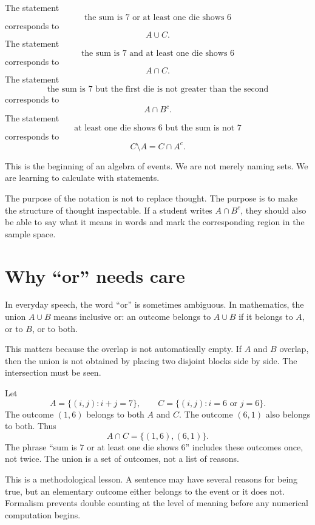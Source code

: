 The statement
\[
\text{the sum is }7\text{ or at least one die shows }6
\]
corresponds to
\[
A\cup C.
\]
The statement
\[
\text{the sum is }7\text{ and at least one die shows }6
\]
corresponds to
\[
A\cap C.
\]
The statement
\[
\text{the sum is }7\text{ but the first die is not greater than the second}
\]
corresponds to
\[
A\cap B^c.
\]
The statement
\[
\text{at least one die shows }6\text{ but the sum is not }7
\]
corresponds to
\[
C\setminus A=C\cap A^c.
\]

This is the beginning of an algebra of events. We are not merely naming sets. We are learning to calculate with statements.

\begin{remarkbox}
The purpose of the notation is not to replace thought. The purpose is to make the structure of thought inspectable. If a student writes \(A\cap B^c\), they should also be able to say what it means in words and mark the corresponding region in the sample space.
\end{remarkbox}

\section{Why ``or'' needs care}

In everyday speech, the word ``or'' is sometimes ambiguous. In mathematics, the union \(A\cup B\) means inclusive or: an outcome belongs to \(A\cup B\) if it belongs to \(A\), or to \(B\), or to both.

This matters because the overlap is not automatically empty. If \(A\) and \(B\) overlap, then the union is not obtained by placing two disjoint blocks side by side. The intersection must be seen.

\begin{examplebox}
Let
\[
A=\{(i,j):i+j=7\},\qquad C=\{(i,j):i=6\text{ or }j=6\}.
\]
The outcome \((1,6)\) belongs to both \(A\) and \(C\). The outcome \((6,1)\) also belongs to both. Thus
\[
A\cap C=\{(1,6),(6,1)\}.
\]
The phrase ``sum is \(7\) or at least one die shows \(6\)'' includes these outcomes once, not twice. The union is a set of outcomes, not a list of reasons.
\end{examplebox}

This is a methodological lesson. A sentence may have several reasons for being true, but an elementary outcome either belongs to the event or it does not. Formalism prevents double counting at the level of meaning before any numerical computation begins.

